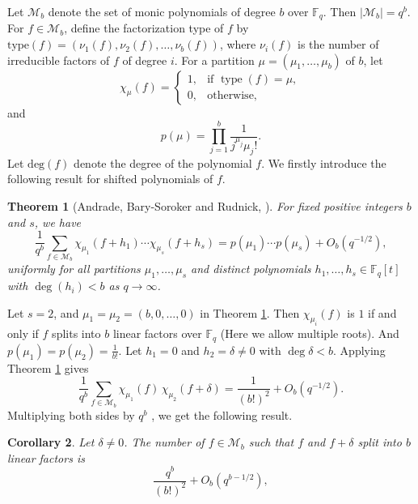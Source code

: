 \documentclass[11pt,a4paper]{article}
\newtheorem{theorem}{Theorem}[section]
\newtheorem{corollary}[theorem]{Corollary}
\theoremstyle{definition}
\theoremstyle{remark}
\newcommand{\F}{\mathbb{F}}
\begin{document}
Let $\mathcal{M}_b$ denote the set of monic polynomials of degree $b$ over $\F_q$. Then  $|\mathcal{M}_b| = q^b$.
For $f\in \mathcal{M}_b$, define the factorization type of $f$ by $\mathrm{type}(f)=(\nu_1(f),\nu_2(f),\ldots,\nu_b(f))$,  where $\nu_i(f)$ is the number of irreducible factors of $f$ of degree $i$. 
For a partition $\mu=(\mu_1,\ldots,\mu_b)$ of $b$, let
$$
\chi_\mu(f)=
\begin{cases}
1, & \text{if } \operatorname{type}(f)=\mu,\\
0, & \text{otherwise},
\end{cases}
$$
and
$$
p(\mu)=\prod_{j=1}^b \frac{1}{j^{\mu_j}\mu_j!}.
$$
Let $\mathrm{deg}(f)$ denote the degree of the polynomial $f$. We firstly introduce the following result for shifted polynomials of $f$.
\begin{theorem}[Andrade, Bary-Soroker and Rudnick, \cite{andrade2013shifted}]\label{ABR-th}
For fixed positive integers $b$ and $s$, we have
\[
\frac{1}{q^b} \sum_{f \in \mathcal{M}_b} \chi_{\mu_1}(f+h_1) \cdots \chi_{\mu_s}(f+h_s) = p(\mu_1) \cdots p(\mu_s) + O_b(q^{-1/2}),
\]
uniformly for all partitions $\mu_1, \dots, \mu_s$ and distinct polynomials $h_1, \dots, h_s \in \mathbb{F}_q[t]$ with $\deg(h_i) < b$ as $q \to \infty$.
\end{theorem}


Let $s = 2$, and $\mu_1 = \mu_2=(b,0,\ldots,0)$ in Theorem \ref{ABR-th}.
Then $\chi_{\mu_i}(f)$ is $1$ if and only if $f$ splits into $b$ linear factors over $\mathbb{F}_q$ (Here we allow multiple roots). And $p(\mu_1)=p(\mu_2)= \frac{1}{b!}.$
Let $h_1 = 0$ and $h_2 = \delta\neq 0$ with $\deg \delta < b$.
Applying Theorem \ref{ABR-th} gives
\[
\frac{1}{q^b} \sum_{f \in \mathcal{M}_b} \chi_{\mu_1}(f) \, \chi_{\mu_2}(f+\delta) = \frac{1}{(b!)^2} + O_b(q^{-1/2}).
\]
Multiplying both sides by $q^b$ , we get the following result.
\begin{corollary}\label{f and f+delta split}
    Let $\delta\neq 0$. The number of $f \in \mathcal{M}_b$ such that $f$ and $f+\delta$ split into $b$ linear factors is 
\begin{equation*}\label{f and f+delta split}
    \frac{q^b}{(b!)^2} + O_b\left(q^{b-1/2}\right),
\end{equation*}
\end{corollary}
\end{document}
